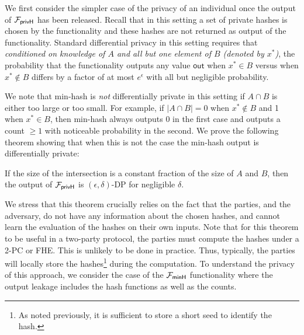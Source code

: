 We first consider the simpler case of the privacy of an individual once the output of ${\mathcal{F}_\mathsf{privH}}$ has been released.
Recall that in this setting a set of private hashes is chosen by the functionality and these hashes are not returned as output of the functionality.
Standard differential privacy in this setting requires that \emph{conditioned on knowledge of $A$ and all but one element of 
$B$ (denoted by $x^*$)}, the probability that the functionality outputs any value $\mathsf{out}$
when $x^* \in B$ versus when $x^* \notin B$ differs by a factor of at most $e^\epsilon$ with all but negligible probability.  

We note that min-hash is \emph{not} differentially private in this setting if $A \cap B$ is either too large or too small.  For example, if $|A \cap B|=0$ when $x^* \notin B$ and 1 when $x^* \in B$, then min-hash always outputs 0 in the first case and outputs a count $\ge 1$ with noticeable probability in the second. We prove the following theorem showing that when this is not the case the min-hash output is differentially private:

\begin{theorem}[Informal]\label{thm:dpInformal}
If the size of the intersection 
is a constant fraction of the size of $A$ and $B$,
then the output of ${\mathcal{F}_\mathsf{privH}}$ is $(\epsilon,\delta)$-DP for negligible $\delta$.
\end{theorem}

We stress that this theorem crucially relies on the fact that the parties, and the adversary, do not have any information about the chosen hashes, and cannot learn the evaluation of the hashes on their own inputs.  
Note that for this theorem to be useful in a two-party protocol, the parties must compute the hashes under a 2-PC or FHE.
This is unlikely to be done in practice.
Thus, typically,
the parties will locally store the hashes\footnote{As noted previously, it is sufficient to store a short seed to identify the hash.} during the computation.  To understand the privacy of this approach, we consider the case of the ${\mathcal{F}_\mathsf{minH}}$ functionality where the output leakage includes the hash functions as well as the counts.


